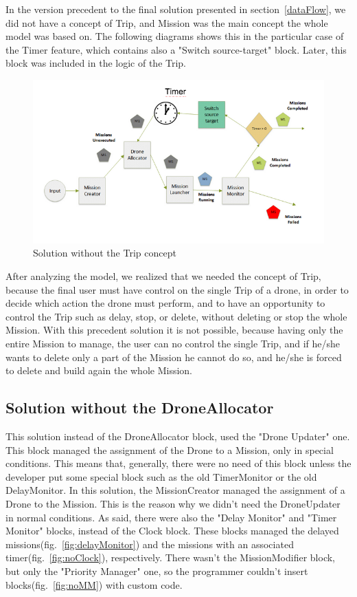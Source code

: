 In the version precedent to the final solution presented in section~\ref{dataFlow}, we did not have a concept of Trip, and Mission was the main concept the whole model was based on. The following diagrams shows this in the particular case of the Timer feature, which contains also a "Switch source-target" block. Later, this block was included in the logic of the Trip.

\begin{figure}[H]
  \centering
  \includegraphics[width=\linewidth]{pictures/NoTrip.png}
  \caption{Solution without the Trip concept}
  \label{fig:noTrip}
\end{figure}

After analyzing the model, we realized that we needed the concept of Trip, because the final user must have control on the single Trip of a drone, in order to decide which action the drone must perform, and to have an opportunity to control the Trip such as delay, stop, or delete, without deleting or stop the whole Mission. With this precedent solution it is not possible, because having only the entire  Mission to manage, the user can no control the single Trip, and if he/she wants to delete only a part of the Mission he cannot do so, and he/she is forced to delete and build again the whole Mission.

\subsection{Solution without the DroneAllocator}


This solution instead of the DroneAllocator block, used the "Drone Updater" one. This block managed the assignment of the Drone to a Mission, only in special conditions. This means that, generally, there were no need of this block unless the developer put some special block such as the old TimerMonitor or the old DelayMonitor.
In this solution, the MissionCreator managed the assignment of a Drone to the Mission. This is the reason why we didn't need the DroneUpdater in normal conditions.
As said, there were also the "Delay Monitor" and "Timer Monitor" blocks, instead of the Clock block.
These blocks managed the delayed missions(fig.~\ref{fig:delayMonitor}) and the missions with an associated timer(fig.~\ref{fig:noClock}), respectively.
There wasn't the MissionModifier block, but only the "Priority Manager" one, so the programmer couldn't insert blocks(fig.~\ref{fig:noMM}) with custom code.

